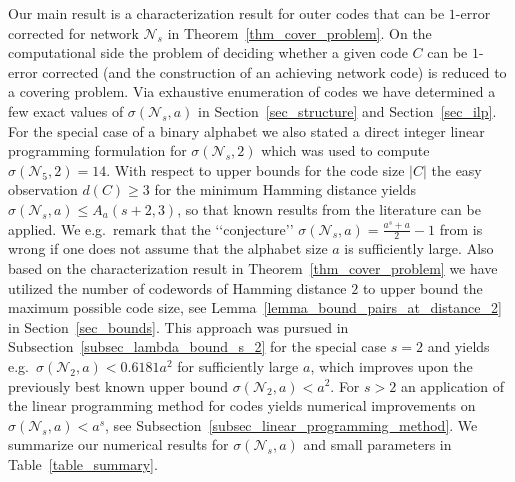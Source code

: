 \documentclass[11pt]{article}
\newcommand{\cN}{\mathcal{N}}
\begin{document}
Our main result is a characterization result for outer codes that can be $1$-error corrected for network $\cN_s$ in Theorem~\ref{thm_cover_problem}. 
On the computational side the problem of deciding whether a given code $C$ can be $1$-error corrected (and the construction of an achieving network code) 
is reduced to a covering problem. Via exhaustive enumeration of codes we have determined a few exact values of $\sigma(\cN_s,a)$ in Section~\ref{sec_structure} 
and Section~\ref{sec_ilp}. For the special case of a binary alphabet we also stated a direct integer linear programming formulation 
for $\sigma(\cN_s,2)$ which was used to compute $\sigma(\cN_5,2)=14$. With respect to upper bounds for the code size $|C|$ the easy observation $d(C)\ge 3$ 
for the minimum Hamming distance yields $\sigma(\cN_s,a)\le A_a(s+2,3)$, so that known results from the literature can be applied. We e.g.\ remark 
that the {\lq\lq}conjecture{\rq\rq} $\sigma(\cN_s,a)=\frac{a^s+a}{2}-1$ from \cite[Remark 5.10]{beemer2022network_arxiv} is wrong if one does not assume that 
the alphabet size $a$ is sufficiently large. Also based on the characterization result in Theorem~\ref{thm_cover_problem} we have utilized 
the number of codewords of Hamming distance $2$ to upper bound the maximum possible code size, see Lemma~\ref{lemma_bound_pairs_at_distance_2} in Section~\ref{sec_bounds}. 
This approach was pursued in Subsection~\ref{subsec_lambda_bound_s_2} for the special case $s=2$ and yields e.g.\ $\sigma(\cN_2,a)<0.6181a^2$ for sufficiently 
large $a$, which improves upon the previously best known upper bound $\sigma(\cN_2,a)<a^2$. For $s>2$ an application of the linear programming method for codes 
yields numerical improvements on $\sigma(\cN_s,a)<a^s$, see Subsection~\ref{subsec_linear_programming_method}. We summarize our numerical results for $\sigma(\cN_s,a)$ 
and small parameters in Table~\ref{table_summary}.       
\end{document}
